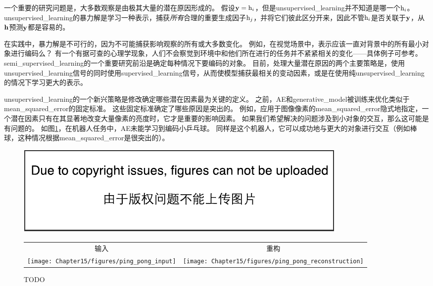 一个重要的研究问题是，大多数观察是由极其大量的潜在原因形成的。
假设$\mathbf{y} = \mathrm{h}_i$，但是\gls{unsupervised_learning}并不知道是哪一个$\mathrm{h}_i$。
\gls{unsupervised_learning}的暴力解是学习一种表示，捕获\emph{所有}合理的重要生成因子$\mathrm{h}_j$，并将它们彼此区分开来，因此不管$\mathrm{h}_i$是否关联于$\mathbf{y}$，从$\mathbf{h}$预测$\mathbf{y}$都是容易的。


在实践中，暴力解是不可行的，因为不可能捕获影响观察的所有或大多数变化。
例如，在视觉场景中，表示应该一直对背景中的所有最小对象进行编码么？
有一个有据可查的心理学现象，人们不会察觉到环境中和他们所在进行的任务并不紧紧相关的变化——具体例子可参考\citep{simons1998failure}。
\gls{semi_supervised_learning}的一个重要研究前沿是确定每种情况下要编码的对象。
目前，处理大量潜在原因的两个主要策略是，使用\gls{unsupervised_learning}信号的同时使用\gls{supervised_learning}信号，从而使模型捕获最相关的变动因素，或是在使用纯\gls{unsupervised_learning}的情况下学习更大的表示。


\gls{unsupervised_learning}的一个新兴策略是修改确定哪些潜在因素最为关键的定义。
之前，\gls{AE}和\gls{generative_model}被训练来优化类似于\gls{mean_squared_error}的固定标准。
这些固定标准确定了哪些原因是突出的。
例如，应用于图像像素的\gls{mean_squared_error}隐式地指定，一个潜在因素只有在其显著地改变大量像素的亮度时，它才是重要的影响因素。
如果我们希望解决的问题涉及到小对象的交互，那么这可能是有问题的。
如图\ref{fig:chap15_pingpong}，在机器人任务中，\gls{AE}未能学习到编码小乒乓球。
同样是这个机器人，它可以成功地与更大的对象进行交互（例如棒球，这种情况根据\gls{mean_squared_error}是很突出的）。

\begin{figure}[!htb]
\ifOpenSource
\centerline{\includegraphics{figure.pdf}}
\else
\begin{tabular}{cc}
输入 & 重构 \\
\texttt{[image: Chapter15/figures/ping\_pong\_input]} &
\texttt{[image: Chapter15/figures/ping\_pong\_reconstruction]}
\end{tabular}
\fi
\caption{TODO}
\label{fig:chap15_pingpong}
\end{figure}

